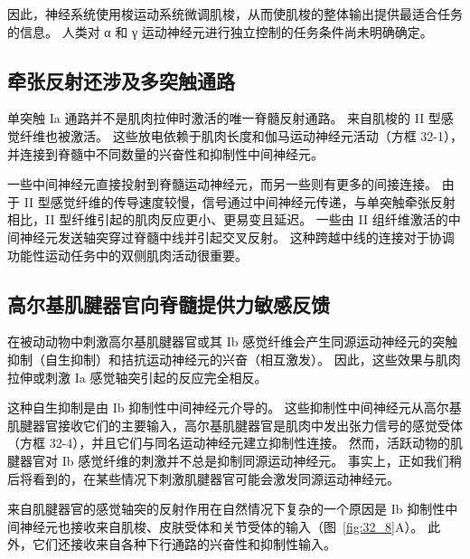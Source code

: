 因此，神经系统使用梭运动系统微调肌梭，从而使肌梭的整体输出提供最适合任务的信息。
人类对 α 和 γ 运动神经元进行独立控制的任务条件尚未明确确定。



\subsection{牵张反射还涉及多突触通路}

单突触 Ia 通路并不是肌肉拉伸时激活的唯一脊髓反射通路。
来自肌梭的 II 型感觉纤维也被激活。
这些放电依赖于肌肉长度和伽马运动神经元活动（方框 32-1），并连接到脊髓中不同数量的兴奋性和抑制性中间神经元。


一些中间神经元直接投射到脊髓运动神经元，而另一些则有更多的间接连接。
由于 II 型感觉纤维的传导速度较慢，信号通过中间神经元传递，与单突触牵张反射相比，II 型纤维引起的肌肉反应更小、更易变且延迟。
一些由 II 组纤维激活的中间神经元发送轴突穿过脊髓中线并引起交叉反射。
这种跨越中线的连接对于协调功能性运动任务中的双侧肌肉活动很重要。



\subsection{高尔基肌腱器官向脊髓提供力敏感反馈}

在被动动物中刺激高尔基肌腱器官或其 Ib 感觉纤维会产生同源运动神经元的突触抑制（自生抑制）和拮抗运动神经元的兴奋（相互激发）。
因此，这些效果与肌肉拉伸或刺激 Ia 感觉轴突引起的反应完全相反。


这种自生抑制是由 Ib 抑制性中间神经元介导的。
这些抑制性中间神经元从高尔基肌腱器官接收它们的主要输入，高尔基肌腱器官是肌肉中发出张力信号的感觉受体（方框 32-4），并且它们与同名运动神经元建立抑制性连接。
然而，活跃动物的肌腱器官对 Ib 感觉纤维的刺激并不总是抑制同源运动神经元。
事实上，正如我们稍后将看到的，在某些情况下刺激肌腱器官可能会激发同源运动神经元。


来自肌腱器官的感觉轴突的反射作用在自然情况下复杂的一个原因是 Ib 抑制性中间神经元也接收来自肌梭、皮肤受体和关节受体的输入（图~\ref{fig:32_8}A）。
此外，它们还接收来自各种下行通路的兴奋性和抑制性输入。


